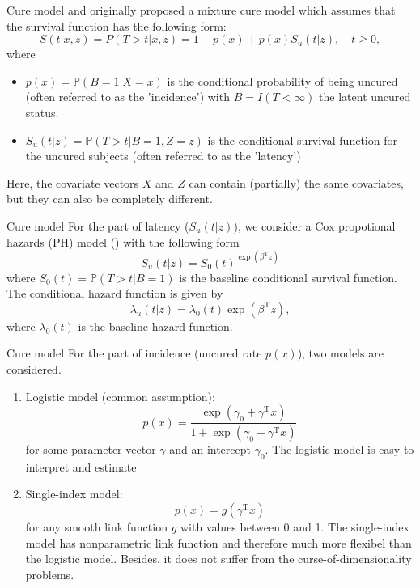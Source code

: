 \documentclass[10 pt]{beamer}
\newcommand{\Trans}  {\mathrm{T}}
\newcommand{\Px}  {\mathbb{P}}
\newcommand{\RedText} {\textcolor[rgb]{1,0,0}}
\begin{document}
\begin{frame}{Cure model}
	\cite{Boag1949} and \cite{Farewell1982} originally proposed a mixture cure model which assumes that the survival function has the following form:
	\begin{equation}\label{equ:sur_fun}
		S(t|x,z) = P(T>t|x,z) = 1 - p(x) + p(x)S_u(t|z),\quad t\geqslant 0,
	\end{equation}
	where 
	\begin{itemize}
		\item 	$p(x)=\Px(B=1|X=x)$ is the conditional probability of being uncured (often referred to as the '\RedText{incidence}') with $B=I(T<\infty)$ the latent uncured status.
		\item $S_u(t|z)=\Px(T>t|B=1,Z=z)$ is the conditional survival function for the uncured subjects (often referred to as the '\RedText{latency}')
	\end{itemize}
	Here, the covariate vectors $X$ and $Z$ can contain (partially) the same covariates, but they can also be completely different.

\end{frame}

\begin{frame}{Cure model}
	For the part of latency ($S_u(t|z)$), we consider a Cox propotional hazards (PH) model (\citealt{Cox1972}) with the following form 
	\begin{equation}
	S_u(t|z) = S_0(t)^{\exp(\beta^\Trans z)}
	\end{equation}
	where $S_0(t)=\Px(T>t|B=1)$ is the baseline conditional survival function. The conditional hazard function is given by 
	$$\lambda_u(t|z)=\lambda_0(t)\exp(\beta^\Trans z),$$
	where $\lambda_0(t)$ is the baseline hazard function.
\end{frame}

\begin{frame}{Cure model}
	For the part of incidence (uncured rate $p(x)$), two models are considered. 
	\begin{enumerate}
		\item Logistic model (common assumption): $$p(x)=\frac{\exp(\gamma_0+\gamma^\Trans x)}{1+\exp(\gamma_0+\gamma^\Trans x)}$$
		for some parameter vector $\gamma$ and an intercept $\gamma_0$. The logistic model is easy to interpret and estimate                                                                                                                                                                                                                                                                                                                                                                                                                                                        
		\item Single-index model:
		$$p(x) = g(\gamma^\Trans x)$$
		for any smooth link function $g$ with values between 0 and 1. The single-index model has nonparametric link function and therefore much more flexibel than the logistic model. Besides, it does not suffer from the curse-of-dimensionality problems.
	\end{enumerate}
\end{frame}
\end{document}
